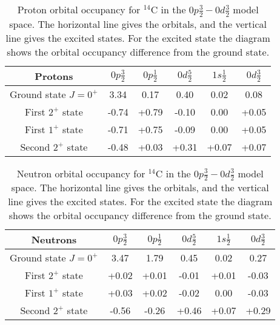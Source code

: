 \begin{table}
\begin{center}
\begin{tabular}{|c|c|c|c|c|c|}
	\hline
	Protons & $0p\frac32$ & $0p\frac12$ & $0d\frac52$ & $1s\frac12$ & $0d\frac32$ \\
	\hline
	Ground state $J=0^+$ & 3.34 & 0.17 & 0.40 & 0.02 & 0.08 \\
	\hline
	First $2^+$ state & -0.74 & +0.79 & -0.10 & 0.00 & +0.05 \\
	\hline
	First $1^+$ state & -0.71 & +0.75 & -0.09 & 0.00 & +0.05 \\
	\hline
	Second $2^+$ state & -0.48 & +0.03 & +0.31 & +0.07 & +0.07 \\
	\hline
\end{tabular}
\caption{Proton orbital occupancy for $^{14}$C in the $0p\frac32-0d\frac32$ model space. The horizontal line gives the orbitals, and the vertical line gives the excited states. For the excited state the diagram shows the orbital occupancy difference from the ground state.}
\label{C14_0d3_p}
\end{center} 
\end{table}

\begin{table}
\begin{center}
\begin{tabular}{|c|c|c|c|c|c|}
	\hline
	Neutrons & $0p\frac32$ & $0p\frac12$ & $0d\frac52$ & $1s\frac12$ & $0d\frac32$  \\
	\hline
	Ground state $J=0^+$ & 3.47 & 1.79 & 0.45 & 0.02 & 0.27 \\
	\hline
	First $2^+$ state & +0.02 & +0.01 & -0.01 & +0.01 & -0.03 \\
	\hline
	First $1^+$ state & +0.03 & +0.02 & -0.02 & 0.00 & -0.03 \\
	\hline
	Second $2^+$ state & -0.56 & -0.26 & +0.46 & +0.07 & +0.29 \\
	\hline
\end{tabular}
\caption{Neutron orbital occupancy for $^{14}$C in the $0p\frac32-0d\frac32$ model space. The horizontal line gives the orbitals, and the vertical line gives the excited states. For the excited state the diagram shows the orbital occupancy difference from the ground state.}
\label{C14_0d3_n}
\end{center}
\end{table}

